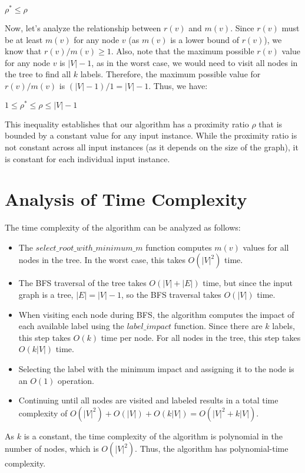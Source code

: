 \documentclass{article}
\begin{document}
$\rho^* \leq \rho$

Now, let's analyze the relationship between $r(v)$ and $m(v)$. Since $r(v)$ must be at least $m(v)$ for any node $v$ (as $m(v)$ is a lower bound of $r(v)$), we know that $r(v) / m(v) \geq 1$. Also, note that the maximum possible $r(v)$ value for any node $v$ is $|V| - 1$, as in the worst case, we would need to visit all nodes in the tree to find all $k$ labels. Therefore, the maximum possible value for $r(v) / m(v)$ is $(|V| - 1) / 1 = |V| - 1$. Thus, we have:

$1 \leq \rho^* \leq \rho \leq |V| - 1$

This inequality establishes that our algorithm has a proximity ratio $\rho$ that is bounded by a constant value for any input instance. While the proximity ratio is not constant across all input instances (as it depends on the size of the graph), it is constant for each individual input instance.

\section{Analysis of Time Complexity}
The time complexity of the algorithm can be analyzed as follows:
\begin{itemize}
  \item The $select\_root\_with\_minimum\_m$ function computes $m(v)$ values for all nodes in the tree. In the worst case, this takes $O(|V|^2)$ time.
  \item The BFS traversal of the tree takes $O(|V| + |E|)$ time, but since the input graph is a tree, $|E| = |V| - 1$, so the BFS traversal takes $O(|V|)$ time.
  \item When visiting each node during BFS, the algorithm computes the impact of each available label using the $label\_impact$ function. Since there are $k$ labels, this step takes $O(k)$ time per node. For all nodes in the tree, this step takes $O(k|V|)$ time.
  \item Selecting the label with the minimum impact and assigning it to the node is an $O(1)$ operation.
  \item Continuing until all nodes are visited and labeled results in a total time complexity of $O(|V|^2) + O(|V|) + O(k|V|) = O(|V|^2 + k|V|)$.
\end{itemize}

As $k$ is a constant, the time complexity of the algorithm is polynomial in the number of nodes, which is $O(|V|^2)$. Thus, the algorithm has polynomial-time complexity.
\end{document}
